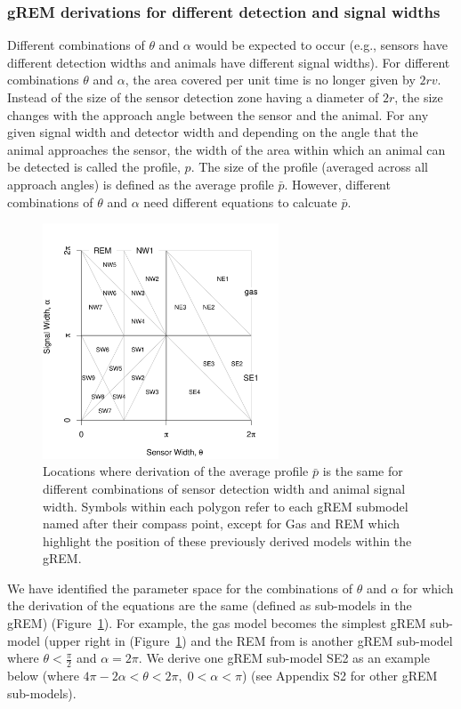 \documentclass[a4paper,10pt,reqno,oneside]{amsart}
\begin{document}
\subsubsection{gREM derivations for different detection and signal widths}
Different combinations of $\theta$ and $\alpha$ would be expected to occur (e.g., sensors have different detection widths and animals have different signal widths). For different combinations $\theta$ and $\alpha$, the area covered per unit time is no longer given by $2rv$. Instead of the size of the sensor detection zone having a diameter of $2r$, the size changes with the approach angle between the sensor and the animal. For any given signal width and detector width and depending on the angle that the animal approaches the sensor, the width of the area within which an animal can be detected is called the profile, $p$. The size of the profile (averaged across all approach angles) is defined as the average profile $\bar{p}$. However, different combinations of $\theta$ and $\alpha$ need different equations to calcuate $\bar{p}$. 

\begin{figure}
\centering
\includegraphics[width=7cm]{imgs/equalRegions.pdf}
\caption{Locations where derivation of the average profile $\bar{p}$ is the same for different combinations of sensor detection width and animal signal width. Symbols within each polygon refer to each gREM submodel named after their compass point, except for Gas and REM which highlight the position of these previously derived models within the gREM.}
\label{f:equalRegions}
\end{figure}

We have identified the parameter space for the combinations of $\theta$ and $\alpha$ for which the derivation of the equations are the same (defined as sub-models in the gREM) (Figure~\ref{f:equalRegions}). For example, the gas model becomes the simplest gREM sub-model (upper right in (Figure~\ref{f:equalRegions}) and the REM from \citep{rowcliffe2008estimating} is another gREM sub-model where $\theta<\frac{\pi}{2}$ and $\alpha = 2\pi$. We derive one gREM sub-model SE2 as an example below (where $4 \pi - 2 \alpha < \theta < 2\pi ,\; 0 < \alpha <\pi$) (see Appendix S2 for other gREM sub-models).
\end{document}
